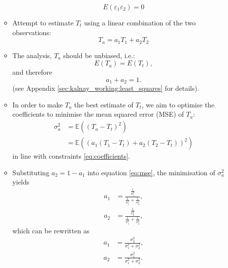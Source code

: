 \begin{itemize}
\begin{itemize}
        \begin{equation}
            E(\varepsilon_1 \varepsilon_2) = 0
        \end{equation}
        \item Attempt to estimate $T_t$ using a linear combination of the two observations:
        \begin{equation}
            T_a = a_1 T_1 + a_2 T_2
        \end{equation}
        \item The analysis, $T_a$ should be unbiased, i.e.:
        \begin{equation}
            E(T_a) = E(T_t),
        \end{equation}
        and therefore
        \begin{equation}
            a_1 + a_2 = 1. \label{eq:coefficients}
        \end{equation}
        (see Appendix \ref{sec:kalnay_working:least_squares} for details).
        \item In order to make $T_a$ the best estimate of $T_t$, we aim to optimise the coefficients to minimise the mean squared error (MSE) of $T_a$:
        \begin{align}
            \sigma_a^2 &= \mathbb{E} \left( \left( T_a - T_t \right)^2 \right) \nonumber \\
                        &= \mathbb{E} \left( \left( a_1(T_1 - T_t) + a_2(T_2 - T_t) \right)^2 \right) \label{eq:mse}
        \end{align}
        in line with constraints \ref{eq:coefficients}.
        \item Substituting $a_2 = 1 - a_1$ into equation \ref{eq:mse}, the minimisation of $\sigma_a^2$ yields
        \begin{subequations}
            \begin{align}
            a_1 &= \frac{\frac{1}{\sigma_1^2}}{\frac{1}{\sigma_1^2} + \frac{1}{\sigma_2^2}}, \\
            a_2 &= \frac{\frac{1}{\sigma_2^2}}{\frac{1}{\sigma_1^2} + \frac{1}{\sigma_2^2}},
            \end{align}
        \end{subequations}
        which can be rewritten as
        \begin{subequations}
            \begin{align}
            a_1 &= \frac{\sigma_2^2}{\sigma_1^2 + \sigma_2^2}, \\
            a_2 &= \frac{\sigma_1^2}{\sigma_1^2 + \sigma_2^2}.
            \end{align}
        \end{subequations}        
    \end{itemize}
\end{itemize}

